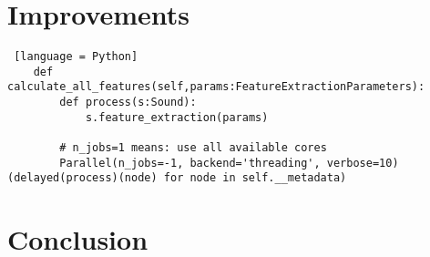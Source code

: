 \documentclass{article}
\begin{document}
\section{Improvements}

\begin{lstlisting} [language = Python]
    def calculate_all_features(self,params:FeatureExtractionParameters):
        def process(s:Sound):
            s.feature_extraction(params)
        
        # n_jobs=1 means: use all available cores
        Parallel(n_jobs=-1, backend='threading', verbose=10)(delayed(process)(node) for node in self.__metadata)
\end{lstlisting}


\section{Conclusion}


\cite{urbansound}

\printbibliography
\end{document}
